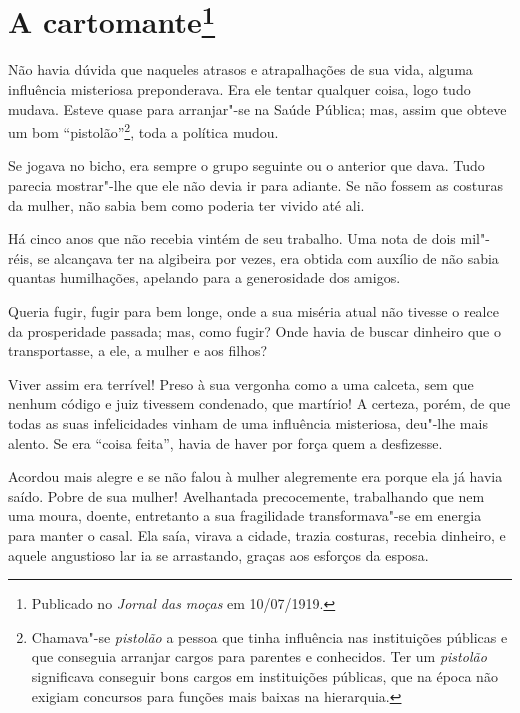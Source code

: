 
\chapter[A cartomante]{A cartomante\footnote[*]{Publicado no \emph{Jornal das moças} em 10/07/1919.}}

Não havia dúvida que naqueles atrasos e atrapalhações de sua vida,
alguma influência misteriosa preponderava. Era ele tentar qualquer
coisa, logo tudo mudava. Esteve quase para arranjar"-se na Saúde Pública;
mas, assim que obteve um bom ``pistolão''\footnote{Chamava"-se
  \emph{pistolão} a pessoa que tinha influência nas instituições
  públicas e que conseguia arranjar cargos para parentes e conhecidos.
  Ter um \emph{pistolão} significava conseguir bons cargos em
  instituições públicas, que na época não exigiam concursos para funções
  mais baixas na hierarquia.}, toda a política mudou.

Se jogava no bicho, era sempre o grupo seguinte ou o anterior que dava.
Tudo parecia mostrar"-lhe que ele não devia ir para adiante. Se não
fossem as costuras da mulher, não sabia bem como poderia ter vivido até
ali.

Há cinco anos que não recebia vintém de seu trabalho. Uma nota de dois
mil"-réis, se alcançava ter na algibeira por vezes, era obtida com
auxílio de não sabia quantas humilhações, apelando para a generosidade
dos amigos.

Queria fugir, fugir para bem longe, onde a sua miséria atual não tivesse
o realce da prosperidade passada; mas, como fugir? Onde havia de buscar
dinheiro que o transportasse, a ele, a mulher e aos filhos?

Viver assim era terrível! Preso à sua vergonha como a uma calceta, sem
que nenhum código e juiz tivessem condenado, que martírio! A certeza,
porém, de que todas as suas infelicidades vinham de uma influência
misteriosa, deu"-lhe mais alento. Se era ``coisa feita'', havia de haver
por força quem a desfizesse.

Acordou mais alegre e se não falou à mulher alegremente era porque ela
já havia saído. Pobre de sua mulher! Avelhantada precocemente,
trabalhando que nem uma moura, doente, entretanto a sua fragilidade
transformava"-se em energia para manter o casal. Ela saía, virava a
cidade, trazia costuras, recebia dinheiro, e aquele angustioso lar ia se
arrastando, graças aos esforços da esposa.


